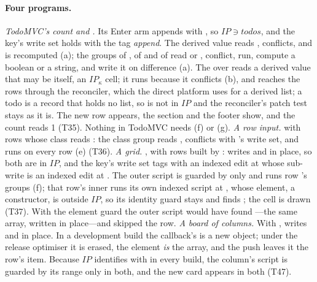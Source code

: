 \paragraph{Four programs.} \emph{TodoMVC's count and .} Its Enter arm appends with
, so $\mathit{IP} \ni \mathit{todos}$, and the key's write set holds
 with the tag \emph{append}. The derived value
 reads , conflicts,
and is recomputed (a); the groups of , of
 and of 
read  or , conflict, run, compute a boolean or a string, and write it on
difference (a). The  over  reads a
derived value that may be  itself, an $\mathit{IP}_\kappa$ cell; it runs because it
conflicts (b), and reaches the rows through the reconciler, which the direct platform uses for a derived
list; a todo is a record that holds no list, so  is not in $\mathit{IP}$ and the
reconciler's patch test stays as it is. The new row appears, the section and the footer show, and the
count reads 1 (T35). Nothing in TodoMVC needs (f) or (g). \emph{A row input.}
 with rows whose class reads
: the class group reads , conflicts with
's write set, and runs on every row (e) (T36). \emph{A grid.}
, with
rows built by :  writes  and
 in place, so both are in $\mathit{IP}$, and the key's write set tags  with an
indexed edit at \code{[r]} whose sub-write is an indexed edit at \code{[c]}. The outer script is guarded
by  only and runs row 's groups (f); that row's inner  runs
its own indexed script at \code{[c]}, whose element, a constructor, is outside $\mathit{IP}$, so its
identity guard stays and finds ; the cell is drawn (T37). With the element guard
the outer script would have found ---the same array, written in
place---and skipped the row. \emph{A board of columns.} With ,
writes  and  in place. In a development build the callback's
 is a new object; under the release optimiser it is erased, the element \emph{is} the array,
and the push leaves it \code{===} the row's item. Because $\mathit{IP}$ identifies  with
 in every build, the column's script is guarded by its range only in both, and the
new card appears in both (T47).

